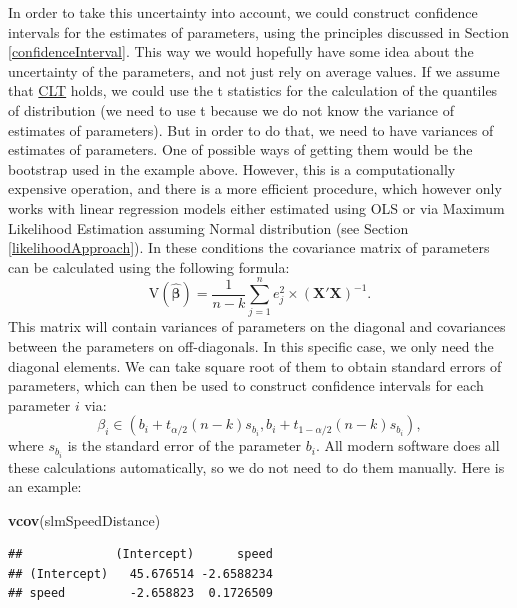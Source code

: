 \documentclass[
]{book}
\newenvironment{Shaded}{\begin{snugshade}}{\end{snugshade}}
\newcommand{\FunctionTok}[1]{\textcolor[rgb]{0.13,0.29,0.53}{\textbf{#1}}}
\newcommand{\NormalTok}[1]{#1}
\theoremstyle{definition}
\theoremstyle{definition}
\theoremstyle{definition}
\theoremstyle{definition}
\theoremstyle{remark}
\begin{document}
In order to take this uncertainty into account, we could construct confidence intervals for the estimates of parameters, using the principles discussed in Section \ref{confidenceInterval}. This way we would hopefully have some idea about the uncertainty of the parameters, and not just rely on average values. If we assume that \hyperref[CLT]{CLT} holds, we could use the t statistics for the calculation of the quantiles of distribution (we need to use t because we do not know the variance of estimates of parameters). But in order to do that, we need to have variances of estimates of parameters. One of possible ways of getting them would be the bootstrap used in the example above. However, this is a computationally expensive operation, and there is a more efficient procedure, which however only works with linear regression models either estimated using OLS or via Maximum Likelihood Estimation assuming Normal distribution (see Section \ref{likelihoodApproach}). In these conditions the covariance matrix of parameters can be calculated using the following formula:
\begin{equation}
    \mathrm{V}(\hat{\boldsymbol{\beta}}) = \frac{1}{n-k} \sum_{j=1}^n e_j^2 \times \left(\mathbf{X}' \mathbf{X}\right)^{-1}.
    \label{eq:MLRcovarianceMatrix}
\end{equation}
This matrix will contain variances of parameters on the diagonal and covariances between the parameters on off-diagonals. In this specific case, we only need the diagonal elements. We can take square root of them to obtain standard errors of parameters, which can then be used to construct confidence intervals for each parameter \(i\) via:
\begin{equation}
    \beta_i \in (b_i + t_{\alpha/2}(n-k) s_{b_i}, b_i + t_{1-\alpha/2}(n-k) s_{b_i}),
    \label{eq:MLRParameterInterval}
\end{equation}
where \(s_{b_i}\) is the standard error of the parameter \(b_i\). All modern software does all these calculations automatically, so we do not need to do them manually. Here is an example:

\begin{Shaded}
\begin{Highlighting}[]
\FunctionTok{vcov}\NormalTok{(slmSpeedDistance)}
\end{Highlighting}
\end{Shaded}

\begin{verbatim}
##             (Intercept)      speed
## (Intercept)   45.676514 -2.6588234
## speed         -2.658823  0.1726509
\end{verbatim}
\end{document}
